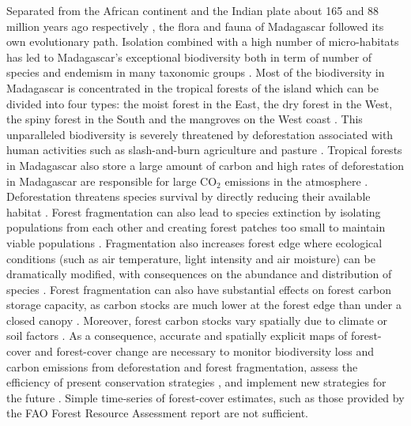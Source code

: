 \documentclass[essd, classical]{copernicus}
\begin{document}
Separated from the African continent and the Indian plate about 165
and 88 million years ago respectively \citep{Ali2008}, the flora and
fauna of Madagascar followed its own evolutionary path. Isolation
combined with a high number of micro-habitats \citep{Pearson2009} has
led to Madagascar's exceptional biodiversity both in term of number of
species and endemism in many taxonomic groups \citep{Crottini2012,
  Goodman2005}. Most of the biodiversity in Madagascar is
concentrated in the tropical forests of the island which can be
divided into four types: the moist forest in the East, the dry forest
in the West, the spiny forest in the South and the mangroves on the
West coast \citep{Vieilledent2016}. This unparalleled biodiversity is
severely threatened by deforestation \citep{Harper2007,
  Vieilledent2013} associated with human activities such as slash-and-burn
agriculture and pasture \citep{Scales2011}. Tropical forests in
Madagascar also store a large amount of carbon \citep{Vieilledent2016}
and high rates of deforestation in Madagascar are responsible for
large CO$_2$ emissions in the atmosphere
\citep{Achard2014}. Deforestation threatens species survival by
directly reducing their available habitat \citep{Brooks2002,
  Tidd2001}. Forest fragmentation can also lead to species extinction
by isolating populations from each other and creating forest patches
too small to maintain viable populations
\citep{Saunders1991}. Fragmentation also increases forest edge where
ecological conditions (such as air temperature, light intensity and
air moisture) can be dramatically modified, with consequences on the
abundance and distribution of species \citep{Murcia1995}. Forest
fragmentation can also have substantial effects on forest carbon
storage capacity, as carbon stocks are much lower at the forest edge
than under a closed canopy \citep{Brinck2017}. Moreover, forest
carbon stocks vary spatially due to climate or soil factors
\citep{Saatchi2011, Vieilledent2016}. As a consequence, accurate and
spatially explicit maps of forest-cover and forest-cover change are
necessary to monitor biodiversity loss and carbon emissions from
deforestation and forest fragmentation, assess the efficiency of
present conservation strategies \citep{Eklund2016}, and implement new
strategies for the future \citep{Vieilledent2013,
  Vieilledent2016}. Simple time-series of forest-cover estimates, such
as those provided by the FAO Forest Resource Assessment report
\citep{Keenan2015} are not sufficient.
\end{document}
